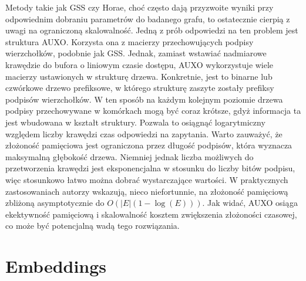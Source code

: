     Metody takie jak GSS czy Horae, choć często dają przyzwoite wyniki przy odpowiednim dobraniu parametrów do badanego grafu, to ostatecznie cierpią z uwagi na ograniczoną skalowalność. Jedną z prób odpowiedzi na ten problem jest struktura AUXO\cite{Jiang_Chen_Jin_2023}. Korzysta ona z macierzy przechowujących podpisy wierzchołków, podobnie jak GSS. Jednak, zamiast wstawiać nadmiarowe krawędzie do bufora o liniowym czasie dostępu, AUXO wykorzystuje wiele macierzy ustawionych w strukturę drzewa. Konkretnie, jest to binarne lub czwórkowe drzewo prefiksowe, w którego strukturę zaszyte zostały prefiksy podpisów wierzchołków. W ten sposób na każdym kolejnym poziomie drzewa podpisy przechowywane w komórkach mogą być coraz krótsze, gdyż informacja ta jest wbudowana w kształt struktury. Pozwala to osiągnąć logarytmiczny względem liczby krawędzi czas odpowiedzi na zapytania. Warto zauważyć, że złożoność pamięciowa jest ograniczona przez długość podpisów, która wyznacza maksymalną głębokość drzewa. Niemniej jednak liczba możliwych do przetworzenia krawędzi jest eksponencjalna w stosunku do liczby bitów podpisu, więc stosunkowo łatwo można dobrać wystarczające wartości. W praktycznych zastosowaniach autorzy wskazują, nieco niefortunnie, na złożoność pamięciową zbliżoną asymptotycznie do $O(|E|(1 - \log(E)))$. Jak widać, AUXO osiąga ekektywność pamięciową i skalowalność kosztem zwiększenia złożoności czasowej, co może być potencjalną wadą tego rozwiązania.
\section{Embeddings}



